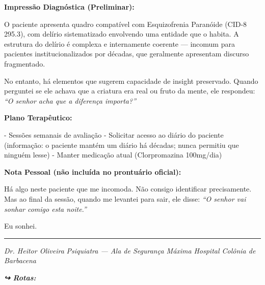 \noindent \textbf{Impressão Diagnóstica (Preliminar):}

\noindent O paciente apresenta quadro compatível com Esquizofrenia Paranóide (CID-8 295.3), com delírio sistematizado envolvendo uma entidade que o habita. A estrutura do delírio é complexa e internamente coerente --- incomum para pacientes institucionalizados por décadas, que geralmente apresentam discurso fragmentado.

\noindent No entanto, há elementos que sugerem capacidade de insight preservado. Quando perguntei se ele achava que a criatura era real ou fruto da mente, ele respondeu: \textit{\textquotedblleft{}O senhor acha que a diferença importa?\textquotedblright{}}

\noindent \textbf{Plano Terapêutico:}

\noindent - Sessões semanais de avaliação
- Solicitar acesso ao diário do paciente (informação: o paciente mantém um diário há décadas; nunca permitiu que ninguém lesse)
- Manter medicação atual (Clorpromazina 100mg/dia)

\noindent \textbf{Nota Pessoal (não incluída no prontuário oficial):}

\noindent Há algo neste paciente que me incomoda. Não consigo identificar precisamente. Mas ao final da sessão, quando me levantei para sair, ele disse: \textit{\textquotedblleft{}O senhor vai sonhar comigo esta noite.\textquotedblright{}}

\noindent Eu sonhei.

\vspace{0.5em}\noindent\rule{\textwidth}{0.5pt}\vspace{0.5em}

\noindent \textit{Dr. Heitor Oliveira}
\textit{Psiquiatra --- Ala de Segurança Máxima}
\textit{Hospital Colônia de Barbacena}

\vspace{0.5em}
\noindent\textit{\textbf{↪ Rotas:}  \rotasep {} \rotasep {} \rotasep {}}